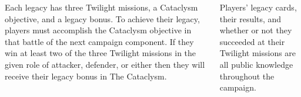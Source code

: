 \begin{columns}

Each legacy has three Twilight missions, a Cataclysm objective, and a
legacy bonus.  To achieve their legacy, players must accomplish the
Cataclysm objective in that battle of the next campaign component.  If
they win at least two of the three Twilight missions in the given role
of attacker, defender, or either then they will receive their legacy
bonus in The Cataclysm.

Players' legacy cards, their results, and whether or not they
succeeded at their Twilight missions are all public knowledge
throughout the campaign.

\end{columns}

\vfill
\noindent
